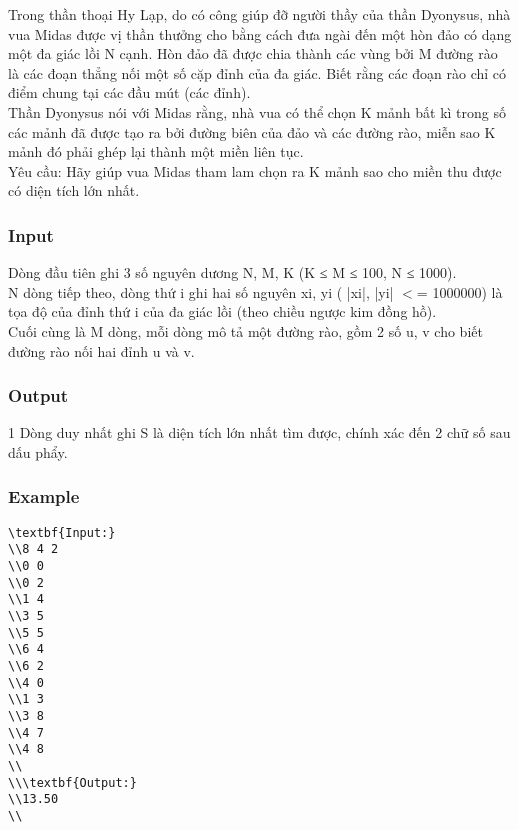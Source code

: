 



   Trong thần thoại Hy Lạp, do có công giúp đỡ người thầy của thần Dyonysus, nhà vua Midas được vị thần thưởng cho bằng  cách đưa ngài đến một hòn đảo có dạng một đa giác lồi N cạnh. Hòn đảo đã được chia thành các vùng bởi M đường rào là các đoạn thẳng nối một số cặp đỉnh của đa giác. Biết rằng các đoạn rào chỉ có điểm chung tại các đầu mút (các đỉnh).   
\\   Thần Dyonysus nói với Midas rằng, nhà vua có thể chọn K mảnh bất kì trong số các mảnh đã được tạo ra bởi đường biên của đảo và các đường rào, miễn sao K mảnh đó phải ghép lại thành một miền liên tục.   
\\   Yêu cầu: Hãy giúp vua Midas tham lam chọn ra K mảnh sao cho miền thu được có diện tích lớn nhất.  

\subsubsection{   Input  }

   Dòng đầu tiên ghi 3 số nguyên dương N, M, K (K ≤ M ≤ 100, N ≤ 1000).   
\\   N dòng tiếp theo, dòng thứ i ghi hai số nguyên xi, yi ( |xi|, |yi| $<$= 1000000) là tọa độ của đỉnh thứ i của đa giác lồi (theo chiều ngược kim đồng hồ).   
\\   Cuối cùng là M dòng, mỗi dòng mô tả một đường rào, gồm 2 số u, v cho biết đường rào nối hai đỉnh u và v.  

\subsubsection{   Output  }

   1 Dòng duy nhất ghi S là diện tích lớn nhất tìm được, chính xác đến 2 chữ số sau dấu phẩy.  

\subsubsection{   Example  }
\begin{verbatim}
\textbf{Input:}
\\8 4 2
\\0 0
\\0 2
\\1 4
\\3 5
\\5 5
\\6 4
\\6 2
\\4 0
\\1 3
\\3 8
\\4 7
\\4 8
\\
\\\textbf{Output:}
\\13.50
\\\end{verbatim}